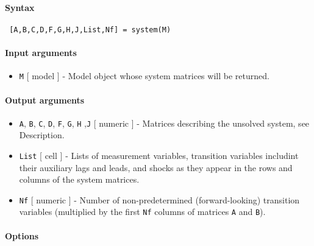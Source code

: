 


	\paragraph{Syntax}
 
 \begin{verbatim}
 [A,B,C,D,F,G,H,J,List,Nf] = system(M)
 \end{verbatim}
 
 \paragraph{Input arguments}
 
 \begin{itemize}
 \item
   \texttt{M} {[} model {]} - Model object whose system matrices will be
   returned.
 \end{itemize}
 
 \paragraph{Output arguments}
 
 \begin{itemize}
 \item
   \texttt{A}, \texttt{B}, \texttt{C}, \texttt{D}, \texttt{F},
   \texttt{G}, \texttt{H} ,\texttt{J} {[} numeric {]} - Matrices
   describing the unsolved system, see Description.
 \item
   \texttt{List} {[} cell {]} - Lists of measurement variables,
   transition variables includint their auxiliary lags and leads, and
   shocks as they appear in the rows and columns of the system matrices.
 \item
   \texttt{Nf} {[} numeric {]} - Number of non-predetermined
   (forward-looking) transition variables (multiplied by the first
   \texttt{Nf} columns of matrices \texttt{A} and \texttt{B}).
 \end{itemize}
 
 \paragraph{Options}
 
